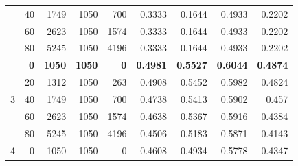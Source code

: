 \documentclass[a4paper]{llncs}
\begin{document}
\begin{table}[htbp!]
\begin{tabular}{crrrrrrrr}
                                & 40                            & 1749                      & 1050                     & 700                        & 0.3333                     & 0.1644                        & 0.4933                  & 0.2202                 \\
                                & 60                            & 2623                      & 1050                     & 1574                       & 0.3333                     & 0.1644                        & 0.4933                  & 0.2202                 \\
                                & 80                            & 5245                      & 1050                     & 4196                       & 0.3333                     & 0.1644                        & 0.4933                  & 0.2202                 \\ \hline
\multirow{5}{*}{3}              & \textbf{0}                    & \textbf{1050}             & \textbf{1050}            & \textbf{0}                 & \textbf{0.4981}            & \textbf{0.5527}               & \textbf{0.6044}         & \textbf{0.4874}        \\
                                & 20                            & 1312                      & 1050                     & 263                        & 0.4908                     & 0.5452                        & 0.5982                  & 0.4824                 \\
                                & 40                            & 1749                      & 1050                     & 700                        & 0.4738                     & 0.5413                        & 0.5902                  & 0.457                  \\
                                & 60                            & 2623                      & 1050                     & 1574                       & 0.4638                     & 0.5367                        & 0.5916                  & 0.4384                 \\
                                & 80                            & 5245                      & 1050                     & 4196                       & 0.4506                     & 0.5183                        & 0.5871                  & 0.4143                 \\ \hline
\multirow{5}{*}{4}              & 0                             & 1050                      & 1050                     & 0                          & 0.4608                     & 0.4934                        & 0.5778                  & 0.4347                 \\

\end{tabular}
\end{table}
\end{document}
